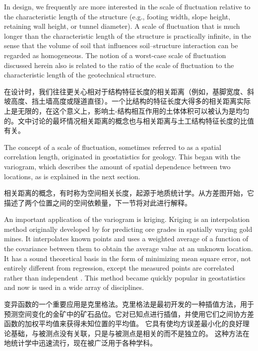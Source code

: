 \begin{ParaColumn}
    \switchcolumn*

    In design, we frequently are more interested in the scale of fluctuation relative to the characteristic length of the structure (e.g., footing width, slope height, retaining wall height, or tunnel diameter). A scale of fluctuation that is much longer than the characteristic length of the structure is practically infinite, in the sense that the volume of soil that influences soil–structure interaction can be regarded as homogeneous. The notion of a worst-case scale of fluctuation discussed herein also is related to the ratio of the scale of fluctuation to the characteristic length of the geotechnical structure.

    \switchcolumn

    在设计时，我们往往更关心相对于结构特征长度的相关距离（例如，基脚宽度、斜坡高度、挡土墙高度或隧道直径）。一个比结构的特征长度大得多的相关距离实际上是无限的，在这个意义上，影响土-结构相互作用的土体体积可以被认为是均匀的。文中讨论的最坏情况相关距离的概念也与相关距离与土工结构特征长度的比值有关。

    \switchcolumn*

    The concept of a scale of fluctuation, sometimes referred to as a spatial correlation length, originated in geostatistics for geology. This began with the variogram, which describes the amount of spatial dependence between two locations, as is explained in the next section.

    \switchcolumn

    相关距离的概念，有时称为空间相关长度，起源于地质统计学。从方差图开始，它描述了两个位置之间的空间依赖量，下一节将对此进行解释。

    \switchcolumn*

    An important application of the variogram is kriging. Kriging is an interpolation method originally developed by \citet{Krige1951119,Krige196613} for predicting ore grades in spatially varying gold mines. It interpolates known points and uses a weighted average of a function of the covariance between them to obtain the average value at an unknown location. It has a sound theoretical basis in the form of minimizing mean square error, not entirely different from regression, except the measured points are correlated rather than independent \citep{Brockwell1991}. This method became quickly popular in geostatistics and now is used in a wide array of disciplines.

    \switchcolumn

    变异函数的一个重要应用是克里格法。克里格法是\citet{Krige1951119,Krige196613}最初开发的一种插值方法，用于预测空间变化的金矿中的矿石品位。它对已知点进行插值，并使用它们之间协方差函数的加权平均值来获得未知位置的平均值。 它具有使均方误差最小化的良好理论基础，与被测点没有关联，只是与被测点是相关的而不是独立的\citep{Brockwell1991}。 这种方法在地统计学中迅速流行，现在被广泛用于各种学科。


\end{ParaColumn}
